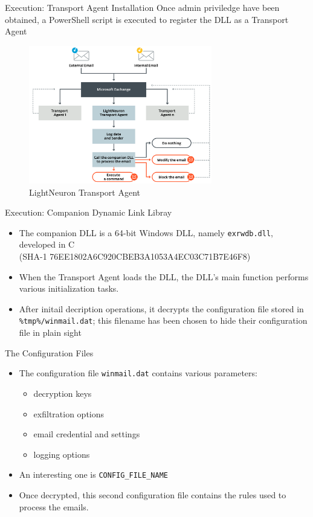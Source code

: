 \begin{frame}[fragile]{Execution: Transport Agent Installation}
    Once admin priviledge have been obtained, a PowerShell script is executed to 
    register the DLL as a Transport Agent
    \begin{figure}
        \includegraphics[width=8cm]{figures/transport_agent.PNG}
        \caption{LightNeuron Transport Agent}
    \end{figure}
\end{frame}

\begin{frame}[fragile]{Execution: Companion Dynamic Link Libray}
    \begin{itemize}
        \item The companion DLL is a 64-bit Windows DLL, namely \texttt{exrwdb.dll}, developed in C \\(SHA-1 76EE1802A6C920CBEB3A1053A4EC03C71B7E46F8)
        \item When the Transport Agent loads the DLL, 
        the DLL’s main function performs various initialization tasks.
        \item After initail decription operations, it decrypts 
        the configuration file stored in \texttt{\%tmp\%/winmail.dat}; 
        this filename has been chosen to hide their configuration file in plain sight
    \end{itemize}
\end{frame}

\begin{frame}[fragile]{The Configuration Files}
    \begin{itemize}
        \item The configuration file \texttt{winmail.dat} contains various parameters:
            \begin{itemize}
                \item decryption keys
                \item exfiltration options
                \item email credential and settings
                \item logging options
            \end{itemize}
        \item An interesting one is \texttt{CONFIG\_FILE\_NAME}
        \item Once decrypted, this second configuration file contains the rules used to process the emails.
    \end{itemize}
\end{frame}

